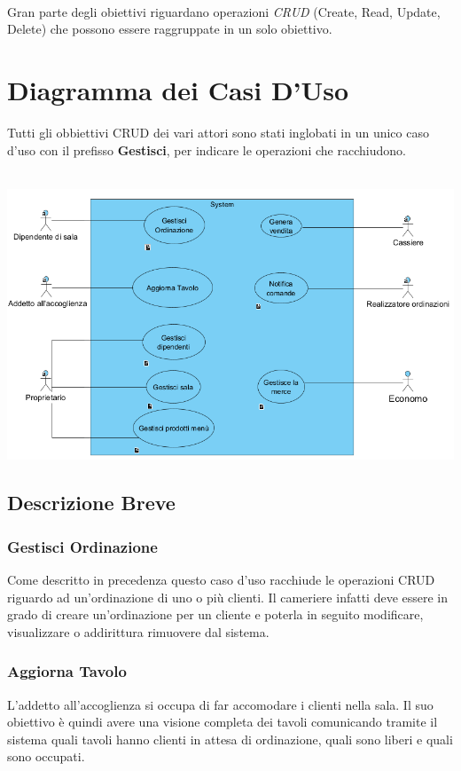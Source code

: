 \\Gran parte degli obiettivi riguardano operazioni \textit{CRUD} (Create, Read, Update, Delete) che possono essere raggruppate in un solo obiettivo.

\newpage
\section{Diagramma dei Casi D'Uso}
Tutti gli obbiettivi CRUD dei vari attori sono stati inglobati in un unico caso d'uso con il prefisso \textbf{Gestisci}, per indicare le operazioni che racchiudono.
\\
\\
\begin{centering}  
	\includegraphics[width=\textwidth]{Immagini/DiagrammaCasiUso.png}
\end{centering}

\subsection{Descrizione Breve}
\subsubsection{Gestisci Ordinazione}
Come descritto in precedenza questo caso d'uso racchiude le operazioni CRUD riguardo ad un'ordinazione di uno o più clienti. Il cameriere infatti deve essere in grado di creare un'ordinazione per un cliente e poterla in seguito modificare, visualizzare o addirittura rimuovere dal sistema.

\subsubsection{Aggiorna Tavolo}
L'addetto all'accoglienza si occupa di far accomodare i clienti nella sala. Il suo obiettivo è quindi avere una visione completa dei tavoli comunicando tramite il sistema  quali tavoli hanno clienti in attesa di ordinazione, quali sono liberi e quali sono occupati.

